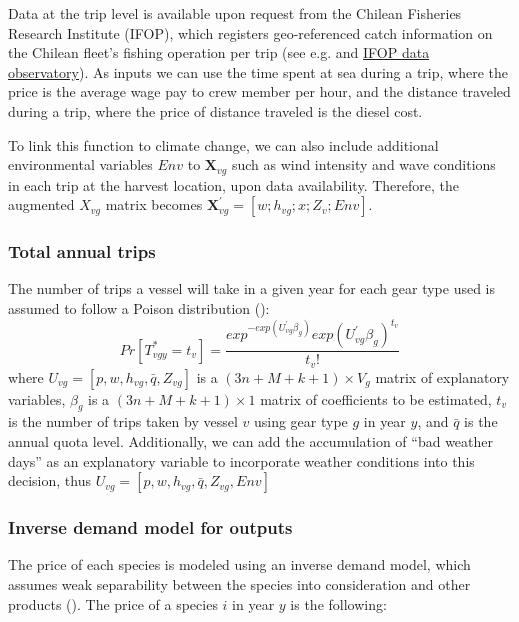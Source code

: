 \documentclass[
  11pt,
]{article}
\begin{document}
Data at the trip level is available upon request from the Chilean
Fisheries Research Institute (IFOP), which registers geo-referenced
catch information on the Chilean fleet's fishing operation per trip (see
e.g.  and
\href{ifop.dataobservatory.net}{IFOP data observatory}). As inputs we
can use the time spent at sea during a trip, where the price is the
average wage pay to crew member per hour, and the distance traveled
during a trip, where the price of distance traveled is the diesel cost.

To link this function to climate change, we can also include additional
environmental variables \(Env\) to \(\mathbf{X}_{vg}\) such as wind
intensity and wave conditions in each trip at the harvest location, upon
data availability. Therefore, the augmented \(X_{vg}\) matrix becomes
\(\mathbf{X}^{'}_{vg} = [w;h_{vg};x;Z_v;Env]\).

\subsubsection{Total annual trips}\label{total-annual-trips}

The number of trips a vessel will take in a given year for each gear
type used is assumed to follow a Poison distribution
(): \begin{equation}
Pr\left[T^{*}_{vgy} = t_v\right] = \frac{exp^{-exp(U^{'}_{vg}\beta_g)}exp(U^{'}_{vg}\beta_g)^{t_v}}{t_v !}
\label{eq5}
\end{equation} where \(U_{vg}=[p,w,h_{vg},\bar{q},Z_{vg}]\) is a
\((3n+M+k+1)×V_g\) matrix of explanatory variables, \(\beta_g\) is a
\((3n+M+k+1)\times1\) matrix of coefficients to be estimated, \(t_v\) is
the number of trips taken by vessel \(v\) using gear type \(g\) in year
\(y\), and \(\bar{q}\) is the annual quota level. Additionally, we can
add the accumulation of ``bad weather days'' as an explanatory variable
to incorporate weather conditions into this decision, thus
\(U_{vg}=[p,w,h_{vg},\bar{q},Z_{vg}, Env]\)

\subsubsection{Inverse demand model for
outputs}\label{inverse-demand-model-for-outputs}

The price of each species is modeled using an inverse demand model,
which assumes weak separability between the species into consideration
and other products ().
The price of a species \(i\) in year \(y\) is the following:
\end{document}
